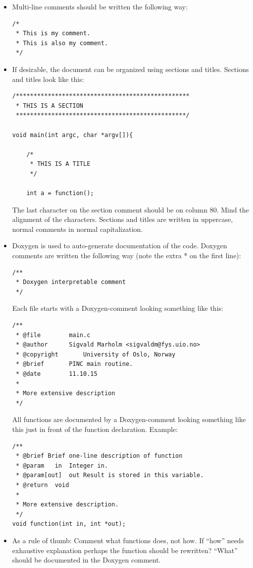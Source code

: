 \documentclass[10pt,a4paper]{article}
\begin{document}
\begin{itemize}
	\item Multi-line comments should be written the following way:
	\begin{lstlisting}
/*
 * This is my comment.
 * This is also my comment.
 */
	\end{lstlisting}
	\newpage
	\item If desirable, the document can be organized using sections and titles. Sections and titles look like this:
	\begin{lstlisting}
/*************************************************
 * THIS IS A SECTION
 ************************************************/

void main(int argc, char *argv[]){

	/*
	 * THIS IS A TITLE
	 */

	int a = function();

	\end{lstlisting}
	The last character on the section comment should be on column 80. Mind the alignment of the characters. Sections and titles are written in uppercase, normal comments in normal capitalization.
	
	
	 \item Doxygen is used to auto-generate documentation of the code. Doxygen comments are written the following way (note the extra * on the first line):
	 \begin{lstlisting}
/**
 * Doxygen interpretable comment
 */
	 \end{lstlisting}
	 Each file starts with a Doxygen-comment looking something like this:
	 \begin{lstlisting}
/**
 * @file		main.c
 * @author		Sigvald Marholm <sigvaldm@fys.uio.no>
 * @copyright		University of Oslo, Norway
 * @brief		PINC main routine.
 * @date		11.10.15
 *
 * More extensive description
 */	 	
	 \end{lstlisting}
	 All functions are documented by a Doxygen-comment looking something like this just in front of the function declaration. Example: 
	 \begin{lstlisting}
/**
 * @brief Brief one-line description of function
 * @param	in	Integer in.
 * @param[out]	out	Result is stored in this variable.
 * @return	void
 *
 * More extensive description.
 */
void function(int in, int *out);
	\end{lstlisting}
	\item As a rule of thumb: Comment what functions does, not how. If ``how'' needs exhaustive explanation perhaps the function should be rewritten? ``What'' should be documented in the Doxygen comment.
\end{itemize}
\end{document}
